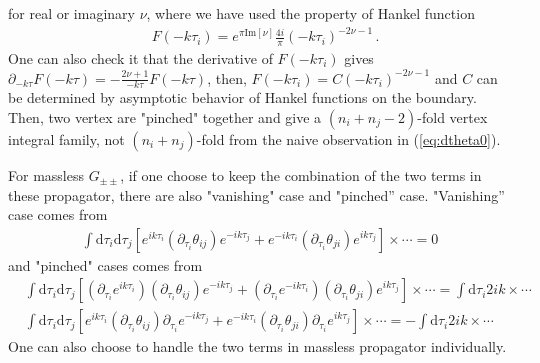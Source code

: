 \documentclass[a4paper,11pt]{article}
\newcommand{\nn}{\nonumber}
\newcommand{\nd}{\mathrm{d}}
\def\eqref#1{(\ref{#1})}
\begin{document}
for real or imaginary $\nu$, where we have used the property of Hankel function
\begin{align}
& F(-k\tau_i) = e^{ \pi \text{Im}[\nu]} \frac{  4 i }{\pi}  (-k\tau_i)^{-2\nu-1} \,  .
\end{align}
One can also check it that the derivative of $F(-k\tau_i)$ gives $\partial_{- k \tau} F(-k\tau) = - \frac{2\nu+1}{- k \tau} F(- k \tau)$, then, $F(-k\tau_i) = C (-k\tau_i)^{-2\nu-1}$ and $C$ can be determined by asymptotic behavior of Hankel functions on the boundary. Then, two vertex are "pinched" together and give  a $(n_i+n_j-2)$-fold vertex integral family, not $(n_i+n_j)$-fold from the naive observation in \eqref{eq:dtheta0}.

For massless $G_{\pm \pm}$, if one choose to keep the combination of the two terms in these propagator, there are also "vanishing" case and "pinched” case. "Vanishing” case comes from
\begin{align}
 \int \nd \tau_i \nd \tau_j \left[ e^{ik \tau_i} (\partial_{\tau_i} \theta_{ij}) e^{ - ik \tau_j} +  e^{-ik \tau_i} (\partial_{\tau_i} \theta_{ji}) e^{  ik \tau_j} \right]\times \cdots = 0
\end{align}
and "pinched" cases comes from
\begin{align}
&\int \nd \tau_i \nd \tau_j \left[  (\partial_{\tau_i}e^{ik \tau_i}) (\partial_{\tau_i} \theta_{ij}) e^{ - ik \tau_j} 
+  (\partial_{\tau_i}e^{-ik \tau_i}) (\partial_{\tau_i} \theta_{ji}) e^{  ik \tau_j} \right] \times \cdots = \int \nd \tau_i 2 i k \times \cdots \nn\\
&\int \nd \tau_i \nd \tau_j \left[  e^{ik \tau_i} (\partial_{\tau_i} \theta_{ij})\partial_{\tau_i} e^{ - ik \tau_j} 
+  e^{-ik \tau_i} (\partial_{\tau_i} \theta_{ji}) \partial_{\tau_i}e^{  ik \tau_j} \right] \times \cdots = -\int \nd \tau_i 2 i k \times \cdots 
\end{align}
One can also choose to handle the two terms in massless propagator individually.
\end{document}
